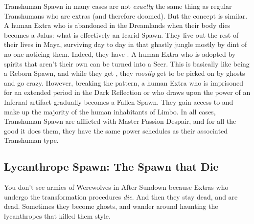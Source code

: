 Transhuman Spawn in many cases are not \textit{exactly} the same thing as regular Transhumans who are extras (and therefore doomed). But the concept is similar. A human Extra who is abandoned in the Dreamlands when their body dies becomes a Jalus: what is effectively an Icarid Spawn. They live out the rest of their lives in Maya, surviving day to day in that ghastly jungle mostly by dint of no one noticing them. Indeed, they have . A human Extra who is adopted by spirits that aren't their own can be turned into a Seer. This is basically like being a Reborn Spawn, and while they get , they \textit{mostly} get to be picked on by ghosts and go crazy. However, breaking the pattern, a human Extra who is imprisoned for an extended period in the Dark Reflection or who draws upon the power of an Infernal artifact gradually becomes a Fallen Spawn. They gain access to  and make up the majority of the human inhabitants of Limbo. In all cases, Transhuman Spawn are afflicted with Master Passion Despair, and for all the good it does them, they have the same power schedules as their associated Transhuman type.

\subsection{Lycanthrope Spawn: The Spawn that Die}

You don't see armies of Werewolves in After Sundown because Extras who undergo the transformation procedures \textit{die}. And then they stay dead, and are dead. Sometimes they become ghosts, and wander around haunting the lycanthropes that killed them  style.